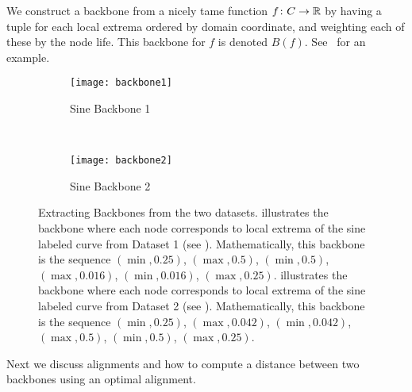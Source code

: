 \begin{rem}
    We construct a backbone from a nicely tame
    function $f \colon C \to \mathbb{R}$ by having a tuple for each local extrema ordered by
    domain coordinate, and weighting each of these by the node life.  This backbone for
    $f$ is denoted $B(f)$.
    See~ for an example.
\end{rem}

\begin{figure}[htp]
    \centering
    \begin{subfigure}[b]{\textwidth}
        \centering
        \texttt{[image: backbone1]}
        \caption{Sine Backbone 1}
        \label{fig:backbone1}
    \end{subfigure} \\
    \begin{subfigure}[b]{\textwidth}
        \centering
        \texttt{[image: backbone2]}
        \caption{Sine Backbone 2}
        \label{fig:backbone2}
    \end{subfigure}
    \caption{Extracting Backbones from the two datasets.
         illustrates the backbone where each node corresponds
        to local extrema of the sine labeled curve from Dataset 1 (see
        ). Mathematically, this backbone is the sequence
        $(\min, 0.25)$, $(\max, 0.5)$, $(\min, 0.5)$, $(\max, 0.016)$, $(\min, 0.016)$,
        $(\max, 0.25)$.   illustrates the backbone where each
        node corresponds to local extrema of the sine labeled curve from Dataset 2
         (see ). Mathematically, this backbone is
        the sequence $(\min, 0.25)$, $(\max, 0.042)$, $(\min, 0.042)$, $(\max, 0.5)$,
        $(\min, 0.5)$, $(\max, 0.25)$. }
        \label{fig:backbones}
\end{figure}

Next we discuss alignments and how to compute a distance between two backbones using an optimal alignment.

